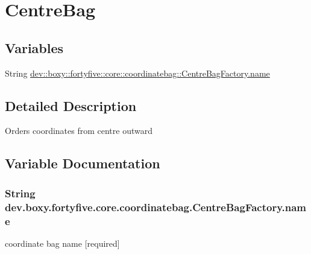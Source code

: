 \hypertarget{group___centre_bag}{
\section{CentreBag}
\label{d2/d39/group___centre_bag}
}
\subsection*{Variables}
\begin{DoxyCompactItemize}
\item 
String \hyperlink{group___centre_bag_ga9cb08e2f0852934e3886db043c9b314b}{dev::boxy::fortyfive::core::coordinatebag::CentreBagFactory.name}
\end{DoxyCompactItemize}


\subsection{Detailed Description}
Orders coordinates from centre outward 

\subsection{Variable Documentation}
\hypertarget{group___centre_bag_ga9cb08e2f0852934e3886db043c9b314b}{
\subsubsection[{name}]{\setlength{\rightskip}{0pt plus 5cm}String {\bf dev.boxy.fortyfive.core.coordinatebag.CentreBagFactory.name}}}
\label{d2/d39/group___centre_bag_ga9cb08e2f0852934e3886db043c9b314b}
coordinate bag name \mbox{[}required\mbox{]} 